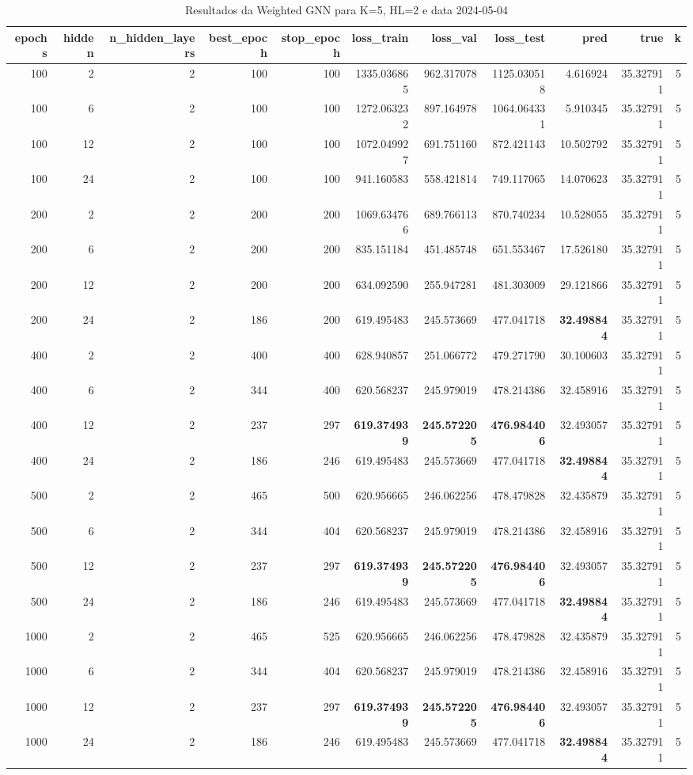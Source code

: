 \begin{table}
\caption{Resultados da Weighted GNN para K=5, HL=2 e data 2024-05-04}
\label{tab:weighted_gnn_results_k5_hl2_d20240504}
\begin{tabular}{rrrrrrrrrrr}
\toprule
epochs & hidden & n\_hidden\_layers & best\_epoch & stop\_epoch & loss\_train & loss\_val & loss\_test & pred & true & k \\
\midrule
100 & 2 & 2 & 100 & 100 & 1335.036865 & 962.317078 & 1125.030518 & 4.616924 & 35.327911 & 5 \\
100 & 6 & 2 & 100 & 100 & 1272.063232 & 897.164978 & 1064.064331 & 5.910345 & 35.327911 & 5 \\
100 & 12 & 2 & 100 & 100 & 1072.049927 & 691.751160 & 872.421143 & 10.502792 & 35.327911 & 5 \\
100 & 24 & 2 & 100 & 100 & 941.160583 & 558.421814 & 749.117065 & 14.070623 & 35.327911 & 5 \\
200 & 2 & 2 & 200 & 200 & 1069.634766 & 689.766113 & 870.740234 & 10.528055 & 35.327911 & 5 \\
200 & 6 & 2 & 200 & 200 & 835.151184 & 451.485748 & 651.553467 & 17.526180 & 35.327911 & 5 \\
200 & 12 & 2 & 200 & 200 & 634.092590 & 255.947281 & 481.303009 & 29.121866 & 35.327911 & 5 \\
200 & 24 & 2 & 186 & 200 & 619.495483 & 245.573669 & 477.041718 & \textbf{32.498844} & 35.327911 & 5 \\
400 & 2 & 2 & 400 & 400 & 628.940857 & 251.066772 & 479.271790 & 30.100603 & 35.327911 & 5 \\
400 & 6 & 2 & 344 & 400 & 620.568237 & 245.979019 & 478.214386 & 32.458916 & 35.327911 & 5 \\
400 & 12 & 2 & 237 & 297 & \textbf{619.374939} & \textbf{245.572205} & \textbf{476.984406} & 32.493057 & 35.327911 & 5 \\
400 & 24 & 2 & 186 & 246 & 619.495483 & 245.573669 & 477.041718 & \textbf{32.498844} & 35.327911 & 5 \\
500 & 2 & 2 & 465 & 500 & 620.956665 & 246.062256 & 478.479828 & 32.435879 & 35.327911 & 5 \\
500 & 6 & 2 & 344 & 404 & 620.568237 & 245.979019 & 478.214386 & 32.458916 & 35.327911 & 5 \\
500 & 12 & 2 & 237 & 297 & \textbf{619.374939} & \textbf{245.572205} & \textbf{476.984406} & 32.493057 & 35.327911 & 5 \\
500 & 24 & 2 & 186 & 246 & 619.495483 & 245.573669 & 477.041718 & \textbf{32.498844} & 35.327911 & 5 \\
1000 & 2 & 2 & 465 & 525 & 620.956665 & 246.062256 & 478.479828 & 32.435879 & 35.327911 & 5 \\
1000 & 6 & 2 & 344 & 404 & 620.568237 & 245.979019 & 478.214386 & 32.458916 & 35.327911 & 5 \\
1000 & 12 & 2 & 237 & 297 & \textbf{619.374939} & \textbf{245.572205} & \textbf{476.984406} & 32.493057 & 35.327911 & 5 \\
1000 & 24 & 2 & 186 & 246 & 619.495483 & 245.573669 & 477.041718 & \textbf{32.498844} & 35.327911 & 5 \\
\bottomrule
\end{tabular}
\end{table}

